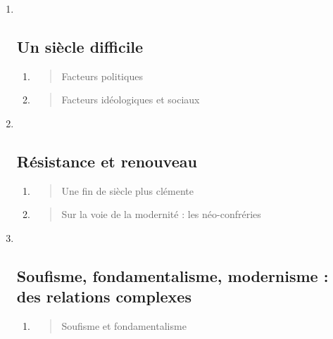 \begin{enumerate}
\def\labelenumi{\Roman{enumi}.}
\item ~
  \hypertarget{un-siuxe8cle-difficile}{%
  \subsection{\texorpdfstring{{Un siècle
  difficile}}{Un siècle difficile}}\label{un-siuxe8cle-difficile}}

  \begin{enumerate}
  \def\labelenumii{\arabic{enumii}.}
  \item
    \begin{quote}
    Facteurs politiques
    \end{quote}
  \item
    \begin{quote}
    Facteurs idéologiques et sociaux
    \end{quote}
  \end{enumerate}
\item ~
  \hypertarget{ruxe9sistance-et-renouveau}{%
  \subsection{\texorpdfstring{{Résistance et
  renouveau}}{Résistance et renouveau}}\label{ruxe9sistance-et-renouveau}}

  \begin{enumerate}
  \def\labelenumii{\arabic{enumii}.}
  \item
    \begin{quote}
    Une fin de siècle plus clémente
    \end{quote}
  \item
    \begin{quote}
    Sur la voie de la modernité : les néo-confréries
    \end{quote}
  \end{enumerate}
\item ~
  \hypertarget{soufisme-fondamentalisme-modernisme-des-relations-complexes}{%
  \subsection{\texorpdfstring{{Soufisme, fondamentalisme,
  modernisme : des relations
  complexes}}{Soufisme, fondamentalisme, modernisme : des relations complexes}}\label{soufisme-fondamentalisme-modernisme-des-relations-complexes}}

  \begin{enumerate}
  \def\labelenumii{\arabic{enumii}.}
  \item
    \begin{quote}
    Soufisme et fondamentalisme
    \end{quote}
  \end{enumerate}
\end{enumerate}

